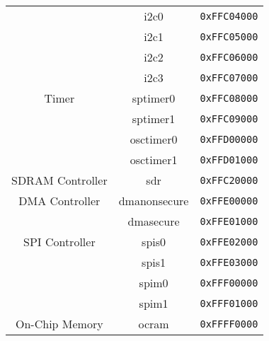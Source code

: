 \begin{table}[h]
\begin{tabular}{|c|c|c|}
            & i2c0
            & \texttt{0xFFC04000}
        \\\cline{2-3}
            & i2c1
            & \texttt{0xFFC05000}
        \\\cline{2-3}
            & i2c2
            & \texttt{0xFFC06000}
        \\\cline{2-3}
            & i2c3
            & \texttt{0xFFC07000}
        \\\hline
            Timer
            & sptimer0
            & \texttt{0xFFC08000}
        \\\cline{2-3}
            & sptimer1
            & \texttt{0xFFC09000}
        \\\cline{2-3}
            & osctimer0
            & \texttt{0xFFD00000}
        \\\cline{2-3}
            & osctimer1
            & \texttt{0xFFD01000}
        \\\hline
            SDRAM Controller
            & sdr
            & \texttt{0xFFC20000}
        \\\hline
            DMA Controller
            & dmanonsecure
            & \texttt{0xFFE00000} 
        \\\cline{2-3}
            & dmasecure
            & \texttt{0xFFE01000}
        \\\hline
            SPI Controller
            & spis0
            & \texttt{0xFFE02000}
        \\\cline{2-3}
            & spis1
            & \texttt{0xFFE03000}
        \\\cline{2-3}
            & spim0
            & \texttt{0xFFF00000}
        \\\cline{2-3}
            & spim1
            & \texttt{0xFFF01000}
        \\\hline
            On-Chip Memory
            & ocram
            & \texttt{0xFFFF0000}
        \\\hline
    \end{tabular}
    \label{tab:builtindevices}
\end{table}
